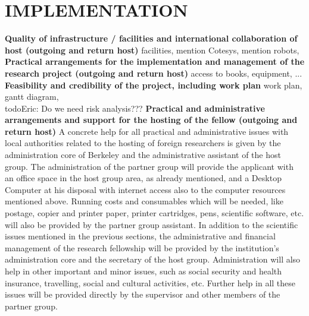 \section{IMPLEMENTATION} %
\label{sec:implementation}
\textbf{Quality of infrastructure / facilities and international collaboration of host (outgoing and 
return host)} 
facilities, mention Cotesys, mention robots, 
\\
\textbf{Practical arrangements for the implementation and management of the research project 
(outgoing and return host)} 
access to books, equipment, ...\\
\textbf{Feasibility and credibility of the project, including work plan} 
work plan, gantt diagram, \\
todo{Eric: Do we need risk analysis???}
\textbf{Practical and administrative arrangements and support for the hosting of the fellow 
(outgoing and return host)} 
A concrete help for all practical and administrative issues with local authorities related to 
the hosting of foreign researchers is given by the administration core of Berkeley and the 
administrative assistant of the host group. The administration of the partner group will 
provide the applicant with an office space in the host group area, as already mentioned, 
and a Desktop Computer at his disposal with internet access also to the computer 
resources mentioned above. Running costs and consumables which will be needed, like 
postage, copier and printer paper, printer cartridges, pens, scientific software, etc. will 
also be provided by the partner group assistant. 
In addition to the scientific issues mentioned in the previous sections, the administrative 
and financial management of the research fellowship will be provided by the institution's 
administration core and the secretary of the host group. Administration will also help in 
other important and minor issues, such as social security and health insurance, travelling, 
social and cultural activities, etc. Further help in all these issues will be provided directly 
by the supervisor and other members of the partner group.\\
\newpage
